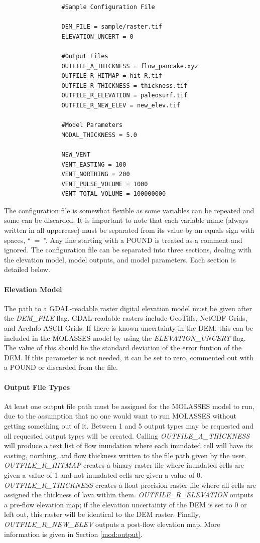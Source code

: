 \documentclass[12pt,letter]{article}
\begin{document}
			\begin{verbatim}
				#Sample Configuration File

				DEM_FILE = sample/raster.tif
				ELEVATION_UNCERT = 0

				#Output Files
				OUTFILE_A_THICKNESS = flow_pancake.xyz
				OUTFILE_R_HITMAP = hit_R.tif
				OUTFILE_R_THICKNESS = thickness.tif
				OUTFILE_R_ELEVATION = paleosurf.tif
				OUTFILE_R_NEW_ELEV = new_elev.tif

				#Model Parameters
				MODAL_THICKNESS = 5.0

				NEW_VENT
				VENT_EASTING = 100
				VENT_NORTHING = 200
				VENT_PULSE_VOLUME = 1000
				VENT_TOTAL_VOLUME = 100000000
			\end{verbatim}
			
			The configuration file is somewhat flexible as some variables can be repeated and some can be discarded. It is important to note that each variable name (always written in all uppercase) must be separated from its value by an equals sign with spaces, ``~=~''. Any line starting with a POUND is treated as a comment and ignored. The configuration file can be separated into three sections, dealing with the elevation model, model outputs, and model parameters. Each section is detailed below.
			
			\paragraph{Elevation Model} The path to a GDAL-readable raster digital elevation model must be given after the \textit{DEM\_FILE} flag. GDAL-readable rasters include GeoTiffs, NetCDF Grids, and ArcInfo ASCII Grids. If there is known uncertainty in the DEM, this can be included in the MOLASSES model by using the \textit{ELEVATION\_UNCERT} flag. The value of this should be the standard deviation of the error funtion of the DEM. If this parameter is not needed, it can be set to zero, commented out with a POUND or discarded from the file.
				
			\paragraph{Output File Types} At least one output file path must be assigned for the MOLASSES model to run, due to the assumption that no one would want to run MOLASSES without getting something out of it. Between 1 and 5 output types may be requested and all requested output types will be created. Calling \textit{OUTFILE\_A\_THICKNESS} will produce a text list of flow inundation where each inundated cell will have its easting, northing, and flow thickness written to the file path given by the user. \textit{OUTFILE\_R\_HITMAP} creates a binary raster file where inundated cells are given a value of 1 and not-inundated cells are given a value of 0. \textit{OUTFILE\_R\_THICKNESS} creates a float-precision raster file where all cells are assigned the thickness of lava within them. \textit{OUTFILE\_R\_ELEVATION} outputs a pre-flow elevation map; if the elevation uncertainty of the DEM is set to 0 or left out, this raster will be identical to the DEM raster. Finally, \textit{OUTFILE\_R\_NEW\_ELEV} outputs a post-flow elevation map. More information is given in Section \ref{mod:output}.
			
\end{document}
